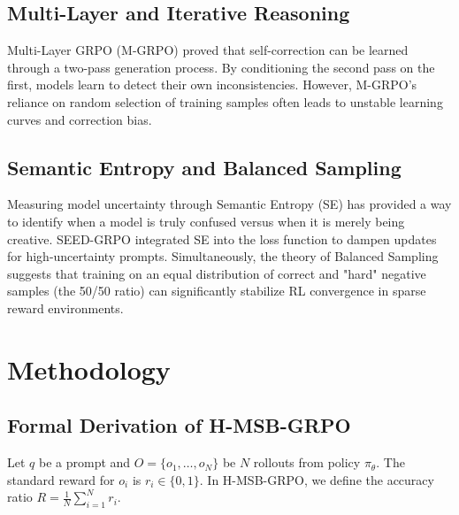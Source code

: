 \documentclass[letterpaper]{article}
\begin{document}
\subsection{Multi-Layer and Iterative Reasoning}
Multi-Layer GRPO (M-GRPO) \cite{mgrpo} proved that self-correction can be learned through a two-pass generation process. By conditioning the second pass on the first, models learn to detect their own inconsistencies. However, M-GRPO's reliance on random selection of training samples often leads to unstable learning curves and correction bias.

\subsection{Semantic Entropy and Balanced Sampling}
Measuring model uncertainty through Semantic Entropy (SE) \cite{kuhn2023semantic} has provided a way to identify when a model is truly confused versus when it is merely being creative. SEED-GRPO \cite{seedgrpo} integrated SE into the loss function to dampen updates for high-uncertainty prompts. Simultaneously, the theory of Balanced Sampling \cite{divagrpo} suggests that training on an equal distribution of correct and "hard" negative samples (the 50/50 ratio) can significantly stabilize RL convergence in sparse reward environments.

\section{Methodology}

\subsection{Formal Derivation of H-MSB-GRPO}
Let $q$ be a prompt and $O = \{o_1, \dots, o_N\}$ be $N$ rollouts from policy $\pi_\theta$. The standard reward for $o_i$ is $r_i \in \{0, 1\}$. In H-MSB-GRPO, we define the accuracy ratio $R = \frac{1}{N} \sum_{i=1}^N r_i$.
\end{document}
